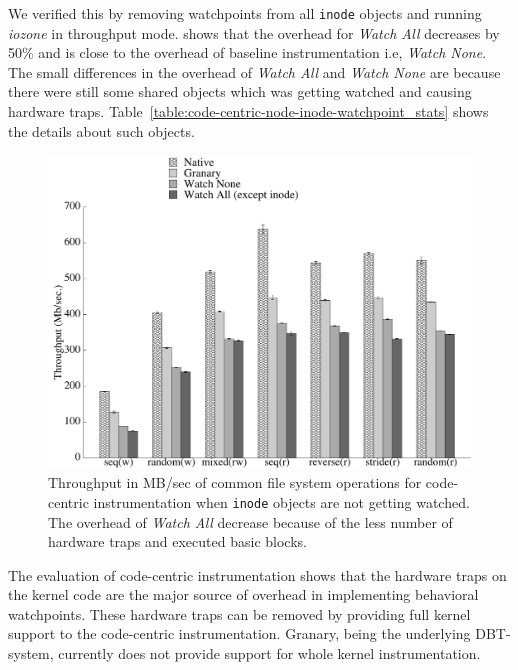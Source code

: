 We verified this by removing watchpoints from all \texttt{inode} objects and running \emph{iozone} in throughput mode.  shows that the overhead for \emph{Watch All} decreases by {\texttildelow}50\% and is close to the overhead of baseline instrumentation i.e, \emph{Watch None}. The small differences in the overhead of \emph{Watch All} and \emph{Watch None} are because there were still some shared objects which was getting watched and causing hardware traps. Table~\ref{table:code-centric-node-inode-watchpoint_stats} shows the details about such objects.


\begin{figure}[t]
\begin{center}
\includegraphics[width=4.5in]{thesis_code_none_inode.pdf}
\end{center}
\caption[Performance impact of code centric instrumentation. The watchpoints are added on all module allocated objects except file \texttt{inode}s.]{\label{fig:watchpoint_performance_code_driven_none_inode}Throughput in MB/sec of common file system operations for code-centric instrumentation when \texttt{inode} objects are not getting watched. The overhead of \emph{Watch All} decrease because of the less number of hardware traps and executed basic blocks.}
\end{figure}


The evaluation of code-centric instrumentation shows that the hardware traps on the kernel code are the major source of overhead in implementing behavioral watchpoints. These hardware traps can be removed by providing full kernel support to the code-centric instrumentation. Granary, being the underlying DBT-system, currently does not provide support for whole kernel instrumentation. 

